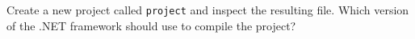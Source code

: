 Create a new \csharp project called \texttt{project} and inspect the resulting  file. Which version of the .NET framework should  use to compile the project?

